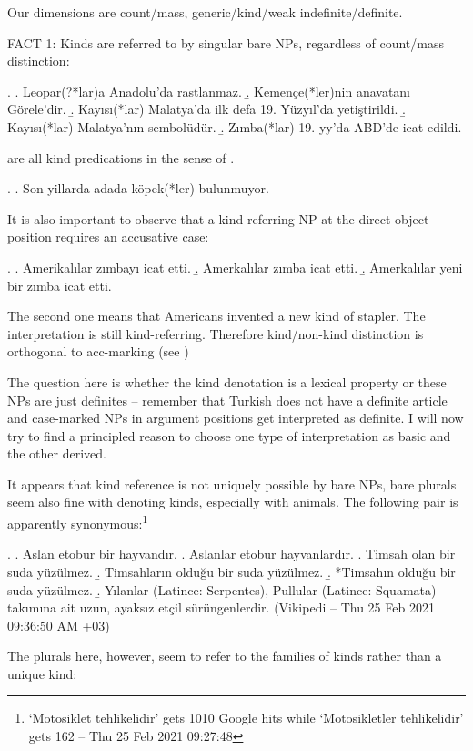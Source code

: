 \documentclass[11pt,a4paper]{article}
\begin{document}
Our dimensions are count/mass, generic/kind/weak indefinite/definite.

FACT 1: Kinds are referred to by singular bare NPs, regardless of count/mass distinction:

\ex.
\a. Leopar(?*lar)a Anadolu'da rastlanmaz.
\b. Kemençe(*ler)nin anavatanı Görele'dir.
\b. Kayısı(*lar) Malatya'da ilk defa 19. Yüzyıl'da yetiştirildi. 
\b. Kayısı(*lar) Malatya'nın sembolüdür.
\b. Zımba(*lar) 19. yy'da ABD'de icat edildi.

are all kind predications in the sense of .


\ex.
\a. Son yillarda adada köpek(*ler) bulunmuyor.



It is also important to observe that a kind-referring NP at the direct object position requires an accusative case:

\ex.
\a. Amerikalılar zımbayı icat etti.
\b. Amerkalılar zımba icat etti.
\b. Amerkalılar yeni bir zımba icat etti.

The second one means that Americans invented a new kind of stapler. The interpretation is still kind-referring. Therefore kind/non-kind distinction is orthogonal to acc-marking (see )

The question here is whether the kind denotation is a lexical property or these NPs are just definites -- remember that Turkish does not have a definite article and case-marked NPs in argument positions get interpreted as definite. I will now try to find a principled reason to choose one type of interpretation as basic and the other derived.

It appears that kind reference is not uniquely possible by bare NPs, bare plurals seem also fine with denoting kinds, especially with animals. The following pair is apparently synonymous:\footnote{`Motosiklet tehlikelidir' gets 1010 Google hits while `Motosikletler tehlikelidir' gets 162 -- Thu 25 Feb 2021 09:27:48}


\ex.
\a. Aslan etobur bir hayvandır.
\b. Aslanlar etobur hayvanlardır.
\b. Timsah olan bir suda yüzülmez.
\b. Timsahların olduğu bir suda yüzülmez.
\b. *Timsahın olduğu bir suda yüzülmez.
\b. Yılanlar (Latince: Serpentes), Pullular (Latince: Squamata) takımına ait uzun, ayaksız etçil sürüngenlerdir. (Vikipedi -- Thu 25 Feb 2021 09:36:50 AM +03)

The plurals here, however, seem to refer to the families of kinds rather than a unique kind:
\end{document}
